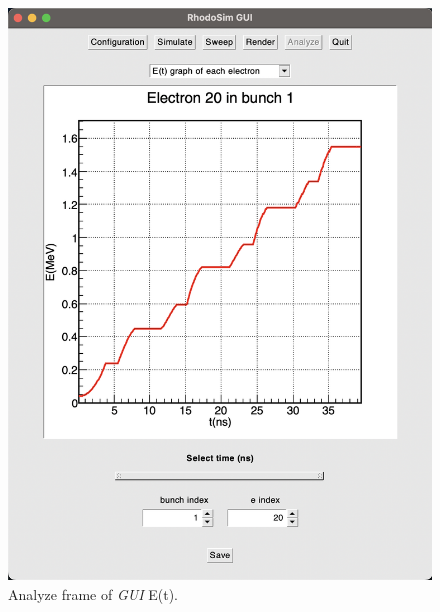 \documentclass[a4paper,oneside,12pt]{report}
\numberwithin{equation}{chapter}
\begin{document}
\begin{figure}
    \centering
    \includegraphics[width=\linewidth]{./figures/rhodoSim/GUI_analyze_Et_1.png}
    \caption{Analyze frame of \textit{GUI} E(t).}
    \label{fig:gui_analyze_Et}
\end{figure}
\end{document}

